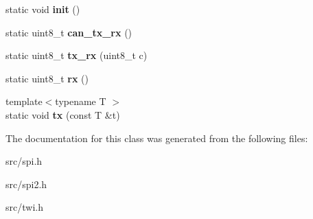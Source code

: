 \begin{DoxyCompactItemize}
static void {\bfseries init} ()
\item 
\hypertarget{classSpiSync_a224c0b96e99813940a1f28ea1ccf1702}{}\label{classSpiSync_a224c0b96e99813940a1f28ea1ccf1702} 
static uint8\+\_\+t {\bfseries can\+\_\+tx\+\_\+rx} ()
\item 
\hypertarget{classSpiSync_a8506142258c37b77e4b7e9cc3b9cb849}{}\label{classSpiSync_a8506142258c37b77e4b7e9cc3b9cb849} 
static uint8\+\_\+t {\bfseries tx\+\_\+rx} (uint8\+\_\+t c)
\item 
\hypertarget{classSpiSync_a64929149114cd33c268223123b8d3072}{}\label{classSpiSync_a64929149114cd33c268223123b8d3072} 
static uint8\+\_\+t {\bfseries rx} ()
\item 
\hypertarget{classSpiSync_aa964af94bb9f7a91f2a878ea7ca879c5}{}\label{classSpiSync_aa964af94bb9f7a91f2a878ea7ca879c5} 
{\footnotesize template$<$typename T $>$ }\\static void {\bfseries tx} (const T \&t)
\end{DoxyCompactItemize}


The documentation for this class was generated from the following files\+:\begin{DoxyCompactItemize}
\item 
src/spi.\+h\item 
src/spi2.\+h\item 
src/twi.\+h\end{DoxyCompactItemize}
